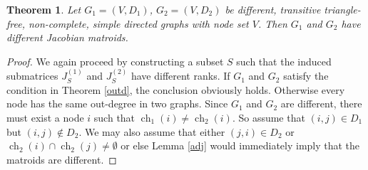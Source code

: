 \documentclass[12pt,reqno]{amsart}
\theoremstyle{plain}
\newtheorem{theorem}{Theorem}[section]
\theoremstyle{definition}
\DeclareMathOperator{\ch}{ch}
\begin{document}
\begin{theorem}\label{notri}
Let $G_1=(V,D_1)$, $G_2=(V,D_2)$ be different, transitive triangle-free, non-complete, simple directed graphs with node set $V$. Then $G_1$ and $G_2$ have different Jacobian matroids.
\end{theorem}
\begin{proof}
We again proceed by constructing a subset $S$ such that the induced submatrices $J^{(1)}_S$ and $J^{(2)}_S$ have different ranks. If $G_1$ and $G_2$ satisfy the condition in Theorem \ref{outd}, the conclusion obviously holds. Otherwise every node has the same out-degree in two graphs. Since $G_1$ and $G_2$ are different, there must exist a node $i$ such that $\ch_1(i)\neq \ch_2(i)$. So assume that $(i,j)\in D_1$ but $(i,j)\notin D_2$. We may also assume that either $(j,i)\in D_2$ or $\ch_2(i)\cap \ch_2(j)\neq\emptyset$ or else Lemma \ref{adj} would immediately imply that the matroids are different. 



\end{proof}
\end{document}
